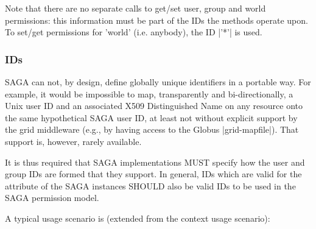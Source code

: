  Note that there are no separate calls to get/set user, group
 and world permissions: this information must be part of the
 IDs the methods operate upon.  To set/get permissions for
 'world' (i.e.  anybody), the ID |'*'| is used.
 
 \subsubsection*{IDs}
 
  SAGA can not, by design, define globally unique identifiers in
  a portable way.  For example, it would be impossible to map,
  transparently and bi-directionally, a Unix user ID and an
  associated X509 Distinguished Name on any resource onto the
  same hypothetical SAGA user ID, at least not without explicit
  support by the grid middleware (e.g., by having access to the
  Globus |grid-mapfile|).  That support is, however, rarely
  available.
 
  It is thus required that SAGA implementations MUST specify how the
  user and group IDs are formed that they support.  In general, IDs
  which are valid for the  attribute of the SAGA
   instances SHOULD also be valid IDs to be used in
  the SAGA permission model.
 
  A typical usage scenario is (extended from the context usage
  scenario):
 
 
